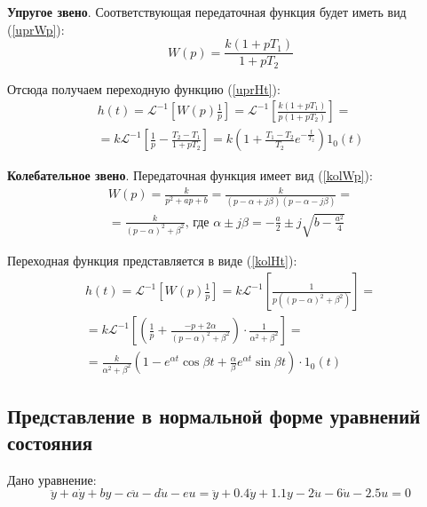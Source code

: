 	\textbf{Упругое звено}. Соответствующая передаточная функция будет иметь вид (\ref{uprWp}):
	\begin{equation}
		W(p) = \frac{k (1 + pT_1)}{1 + pT_2}
		\label{uprWp}
	\end{equation}

	Отсюда получаем переходную функцию (\ref{uprHt}):
	\begin{multline}
		h(t) = \mathcal{L}^{-1} \left[W(p) \frac{1}{p}\right] = \mathcal{L}^{-1} \left[ \frac{k (1 + pT_1)}{p(1 + pT_2)} \right] = \\ = k \mathcal{L} ^{-1} \left[\frac{1}{p} - \frac{T_2 - T_1}{1 + pT_2}\right] = k \left(1 + \frac{T_1 - T_2}{T_2} e^{-\frac{t}{T_2}}\right) 1_0 (t)
		\label{uprHt}
	\end{multline}

	\textbf{Колебательное звено}. Передаточная функция имеет вид (\ref{kolWp}):
	\begin{multline}
		W(p) = \frac{k}{p^2 + ap + b} = \frac{k}{(p-\alpha + j\beta)(p - \alpha - j\beta)} = \\ = \frac{k}{(p-\alpha)^2 + \beta^2},\,\text{где } \alpha \pm j\beta = -\frac{a}{2} \pm j\sqrt{b-\frac{a^2}{4}}
		\label{kolWp}
	\end{multline}

	Переходная функция представляется в виде (\ref{kolHt}):
	\begin{multline}
		h(t) = \mathcal{L}^{-1} \left[W(p) \frac{1}{p}\right] = k\mathcal{L}^{-1} \left[\frac{1}{p( (p-\alpha)^2 + \beta^2)}\right] = \\ = k \mathcal{L}^{-1} \left[ \left( \frac{1}{p} + \frac{-p + 2\alpha}{(p-\alpha)^2 + \beta^2} \right) \cdot \frac{1}{\alpha^2 + \beta^2} \right] = \\ = \frac{k}{\alpha^2 + \beta^2} \left(1 - e^{\alpha t} \cos{\beta t} + \frac{\alpha}{\beta} e^{\alpha t} \sin{\beta t}\right)\cdot 1_0 (t)
		\label{kolHt}
	\end{multline}

	\subsection{Представление в нормальной форме уравнений состояния}
	
	Дано уравнение:
	\begin{equation*}
		\ddot{y} + a\dot{y} + by - c\ddot{u} -d\dot{u} - eu = \ddot{y} + 0.4\dot{y} + 1.1y - 2\ddot{u} - 6\dot{u} - 2.5u = 0
	\end{equation*}
	
